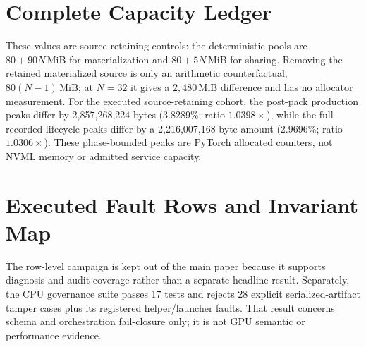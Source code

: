 \documentclass{article}
\newcommand{\mib}{\,\mathrm{MiB}}
\begin{document}
\section{Complete Capacity Ledger}
\label{app:capacity}


These values are source-retaining controls: the deterministic pools are
$80+90N\mib$ for materialization and $80+5N\mib$ for sharing.  Removing the
retained materialized source is only an arithmetic counterfactual,
$80(N-1)\mib$; at $N=32$ it gives a $2,480\mib$ difference and has no allocator
measurement.  For the executed source-retaining cohort, the post-pack
production peaks differ by 2,857,268,224 bytes (3.8289\%; ratio
$1.0398\times$), while the full recorded-lifecycle peaks differ by a
2,216,007,168-byte amount (2.9696\%; ratio $1.0306\times$).  These phase-bounded
peaks are PyTorch allocated counters, not NVML memory or admitted service
capacity.

\section{Executed Fault Rows and Invariant Map}
\label{app:invariants}

The row-level campaign is kept out of the main paper because it supports
diagnosis and audit coverage rather than a separate headline result.
Separately, the CPU governance suite passes 17 tests and rejects 28 explicit
serialized-artifact tamper cases plus its registered helper/launcher faults.
That result concerns schema and orchestration fail-closure only; it is not GPU
semantic or performance evidence.

\end{document}
